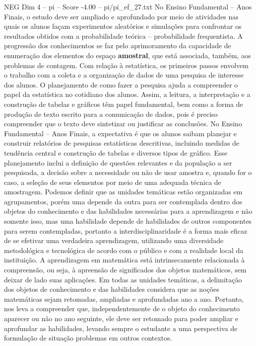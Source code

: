 \begin{textsample}{NEG Dim 4 – pi – Score -4.00 – pi/pi\_ef\_27.txt}
No Ensino Fundamental – Anos Finais, o estudo deve ser ampliado e aprofundado por meio de atividades nas quais os alunos façam experimentos aleatórios e simulações para confrontar os resultados obtidos com a probabilidade teórica – probabilidade frequentista.
A progressão dos conhecimentos se faz pelo aprimoramento da capacidade de enumeração dos elementos do espaço \textbf{amostral}, que está associada, também, aos problemas de contagem.
Com relação à estatística, os primeiros passos envolvem o trabalho com a coleta e a organização de dados de uma pesquisa de interesse dos alunos.
O planejamento de como fazer a pesquisa ajuda a compreender o papel da estatística no cotidiano dos alunos.
Assim, a leitura, a interpretação e a construção de tabelas e gráficos têm papel fundamental, bem como a forma de produção de texto escrito para a comunicação de dados, pois é preciso compreender que o texto deve sintetizar ou justificar as conclusões.
No Ensino Fundamental – Anos Finais, a expectativa é que os alunos saibam planejar e construir relatórios de pesquisas estatísticas descritivas, incluindo medidas de tendência central e construção de tabelas e diversos tipos de gráfico.
Esse planejamento inclui a definição de questões relevantes e da população a ser pesquisada, a decisão sobre a necessidade ou não de usar amostra e, quando for o caso, a seleção de seus elementos por meio de uma adequada técnica de amostragem.
Podemos definir que as unidades temáticas estão organizadas em agrupamentos, porém uma depende da outra para ser contemplada dentro dos objetos do conhecimento e das habilidades necessárias para a aprendizagem e não somente isso, mas uma habilidade depende de habilidades de outros componentes para serem contempladas, portanto a interdisciplinaridade é a forma mais eficaz de se efetivar uma verdadeira aprendizagem, utilizando uma diversidade metodológica e tecnológica de acordo com o público e com a realidade local da instituição.
A aprendizagem em matemática está intrinsecamente relacionada à compreensão, ou seja, à apreensão de significados dos objetos matemáticos, sem deixar de lado suas aplicações.
Em todas as unidades temáticas, a delimitação dos objetos de conhecimento e das habilidades considera que as noções matemáticas sejam retomadas, ampliadas e aprofundadas ano a ano.
Portanto, nos leva a compreender que, independentemente de o objeto do conhecimento aparecer ou não no ano seguinte, ele deve ser retomado para poder ampliar e aprofundar as habilidades, levando sempre o estudante a uma perspectiva de formulação de situação problemas em outros contextos.

\end{textsample}

